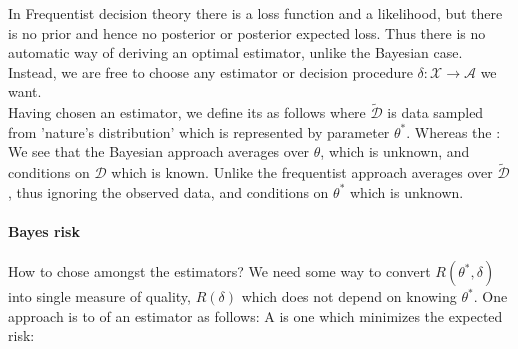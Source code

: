 In Frequentist decision theory there is a loss function and a likelihood, but there
is no prior and hence no posterior or posterior expected loss. Thus there is no 
automatic way of deriving an optimal estimator, unlike the Bayesian case.\\
Instead, we are free to choose any estimator or decision procedure $\delta: \mathcal{X}
\rightarrow \mathcal{A}$ we want.\\
Having chosen an estimator, we define its  as follows
where $\tilde{\mathcal{D}}$ is data sampled from 'nature's distribution' which is 
represented by parameter $\theta^{*}$.
Whereas the : 
We see that the Bayesian approach averages over $\theta$, which is unknown, and conditions
on $\mathcal{D}$ which is known. Unlike the frequentist approach averages over $\tilde{
\mathcal{D}}$, thus ignoring the observed data, and conditions on $\theta^{*}$ which is 
unknown.

\paragraph{Bayes risk}
How to chose amongst the estimators? 
We need some way to convert $R(\theta^{*}, \delta)$ into single measure of quality, $R(
\delta)$ which does not depend on knowing $\theta^{*}$. One approach is to   of an estimator as follows:
A  is one which minimizes the
expected risk: 

